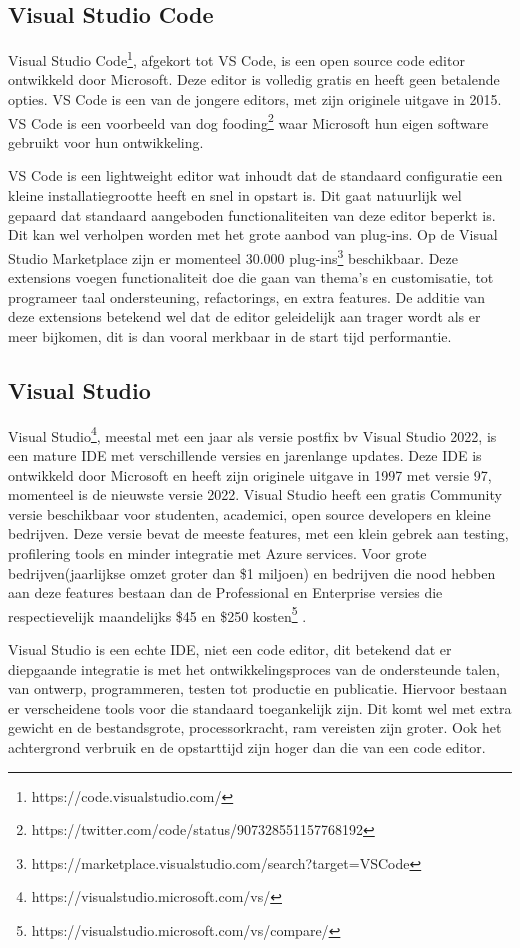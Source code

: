 \subsection{Visual Studio Code}
Visual Studio Code\footnote{https://code.visualstudio.com/}, afgekort tot VS Code, is een open source code editor ontwikkeld door Microsoft. Deze editor is volledig gratis en heeft geen betalende opties. VS Code is een van de jongere editors, met zijn originele uitgave in 2015. VS Code is een voorbeeld van dog fooding\footnote{https://twitter.com/code/status/907328551157768192} waar Microsoft hun eigen software gebruikt voor hun ontwikkeling. 

VS Code is een lightweight editor wat inhoudt dat de standaard configuratie een kleine installatiegrootte heeft en snel in opstart is. Dit gaat natuurlijk wel gepaard dat standaard aangeboden functionaliteiten van deze editor beperkt is. Dit kan wel verholpen worden met het grote aanbod van plug-ins. Op de Visual Studio Marketplace zijn er momenteel 30.000 plug-ins\footnote{https://marketplace.visualstudio.com/search?target=VSCode} beschikbaar. Deze extensions voegen functionaliteit doe die gaan van thema’s en customisatie, tot programeer taal ondersteuning, refactorings, en extra features. De additie van deze extensions betekend wel dat de editor geleidelijk aan trager wordt als er meer bijkomen, dit is dan vooral merkbaar in de start tijd performantie. 

\subsection{Visual Studio }
Visual Studio\footnote{https://visualstudio.microsoft.com/vs/}, meestal met een jaar als versie postfix bv Visual Studio 2022, is een mature IDE met verschillende versies en jarenlange updates. Deze IDE is ontwikkeld door Microsoft en heeft zijn originele uitgave in 1997 met versie 97, momenteel is de nieuwste versie 2022. Visual Studio heeft een gratis Community versie beschikbaar voor studenten, academici, open source developers en kleine bedrijven. Deze versie bevat de meeste features, met een klein gebrek aan testing, profilering tools en minder integratie met Azure services. Voor grote bedrijven(jaarlijkse omzet groter dan \$1 miljoen) en bedrijven die nood hebben aan deze features bestaan dan de Professional en Enterprise versies die respectievelijk maandelijks \$45 en \$250 kosten\footnote{https://visualstudio.microsoft.com/vs/compare/} .

Visual Studio is een echte IDE, niet een code editor, dit betekend dat er diepgaande integratie is met het ontwikkelingsproces van de ondersteunde talen, van ontwerp, programmeren, testen tot productie en publicatie. Hiervoor bestaan er verscheidene tools voor die standaard toegankelijk zijn. Dit komt wel met extra gewicht en de bestandsgrote, processorkracht, ram vereisten zijn groter. Ook het achtergrond verbruik en de opstarttijd zijn hoger dan die van een code editor. 

